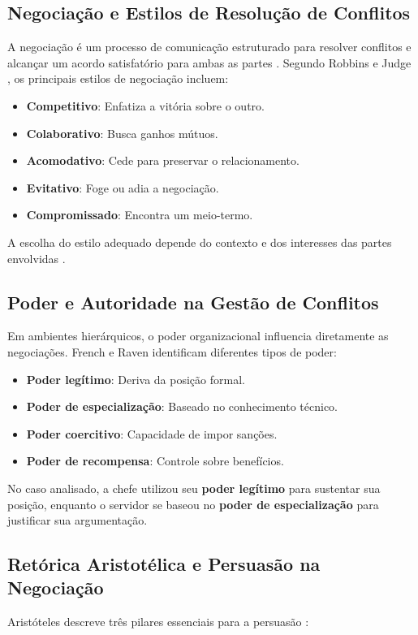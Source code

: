 \documentclass[article,12pt,oneside,a4paper]{article}
\begin{document}
\subsection{Negociação e Estilos de Resolução de Conflitos}
\label{sec:org8420d36}
A negociação é um processo de comunicação estruturado para resolver conflitos e alcançar um acordo satisfatório para ambas as partes \cite{lewicki2015negotiation}. Segundo Robbins e Judge \cite{robbins2015comportamento}, os principais estilos de negociação incluem:

\begin{itemize}
\item \textbf{Competitivo}: Enfatiza a vitória sobre o outro.
\item \textbf{Colaborativo}: Busca ganhos mútuos.
\item \textbf{Acomodativo}: Cede para preservar o relacionamento.
\item \textbf{Evitativo}: Foge ou adia a negociação.
\item \textbf{Compromissado}: Encontra um meio-termo.
\end{itemize}

A escolha do estilo adequado depende do contexto e dos interesses das partes envolvidas \cite{malhotra2016negotiation}.
\subsection{Poder e Autoridade na Gestão de Conflitos}
\label{sec:orge9429b0}
Em ambientes hierárquicos, o poder organizacional influencia diretamente as negociações. French e Raven \cite{french1959bases} identificam diferentes tipos de poder:

\begin{itemize}
\item \textbf{Poder legítimo}: Deriva da posição formal.
\item \textbf{Poder de especialização}: Baseado no conhecimento técnico.
\item \textbf{Poder coercitivo}: Capacidade de impor sanções.
\item \textbf{Poder de recompensa}: Controle sobre benefícios.
\end{itemize}

No caso analisado, a chefe utilizou seu \textbf{poder legítimo} para sustentar sua posição, enquanto o servidor se baseou no \textbf{poder de especialização} para justificar sua argumentação.
\subsection{Retórica Aristotélica e Persuasão na Negociação}
\label{sec:org5c2bcbc}
Aristóteles descreve três pilares essenciais para a persuasão \cite{aristoteles2004retorica}:
\end{document}
